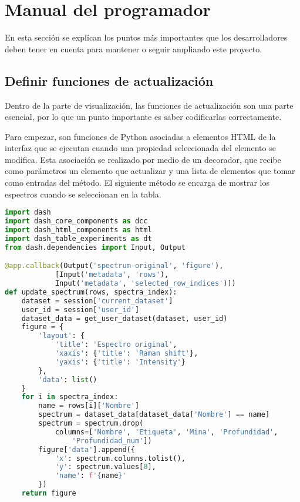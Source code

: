 \section{Manual del programador}

En esta sección se explican los puntos más importantes que los desarrolladores 
deben tener en cuenta para mantener o seguir ampliando este proyecto.

\subsection{Definir funciones de actualización}

Dentro de la parte de visualización, las funciones de actualización son una 
parte esencial, por lo que un punto importante es saber codificarlas 
correctamente.

Para empezar, son funciones de Python asociadas a elementos HTML de la interfaz 
que se ejecutan cuando una propiedad seleccionada del elemento se modifica. 
Esta asociación se realizado por medio de un decorador, que recibe como 
parámetros un elemento que actualizar y una lista de elementos que tomar como 
entradas del método. El siguiente método se encarga de mostrar los espectros 
cuando se seleccionan en la tabla.
\begin{lstlisting}[caption=Carga de espectros al ser seleccionados,frame=single,
breaklines=true,
language=Python,
tabsize=2,
captionpos=b,
keywordstyle=\color{blue},
stringstyle=\color{red}]
import dash
import dash_core_components as dcc
import dash_html_components as html
import dash_table_experiments as dt
from dash.dependencies import Input, Output

@app.callback(Output('spectrum-original', 'figure'),
			[Input('metadata', 'rows'),
			Input('metadata', 'selected_row_indices')])
def update_spectrum(rows, spectra_index):
	dataset = session['current_dataset']
	user_id = session['user_id']
	dataset_data = get_user_dataset(dataset, user_id)
	figure = {
		'layout': {
			'title': 'Espectro original',
			'xaxis': {'title': 'Raman shift'},
			'yaxis': {'title': 'Intensity'}
		},
		'data': list()
	}
	for i in spectra_index:
		name = rows[i]['Nombre']
		spectrum = dataset_data[dataset_data['Nombre'] == name]
		spectrum = spectrum.drop(
			columns=['Nombre', 'Etiqueta', 'Mina', 'Profundidad',
				'Profundidad_num'])
		figure['data'].append({
			'x': spectrum.columns.tolist(),
			'y': spectrum.values[0],
			'name': f'{name}'
		})
	return figure
\end{lstlisting}

